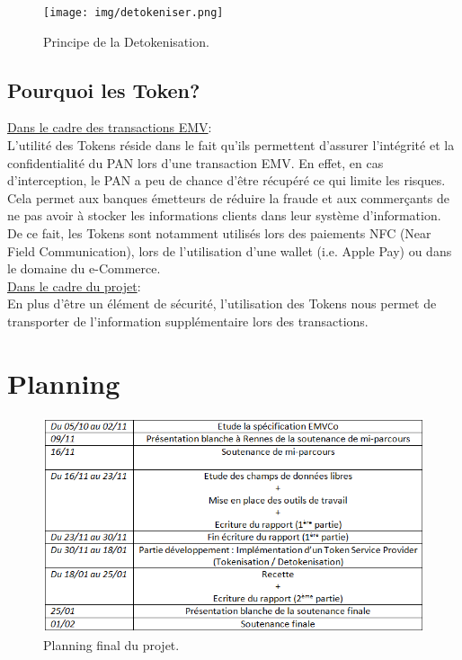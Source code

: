 \documentclass{report}
\begin{document}
\begin{figure}[!h]
    \centering
			\texttt{[image: img/detokeniser.png]}
			\caption{\label{Detokenisation} Principe de la Detokenisation.}			
\end{figure}

\subsection{Pourquoi les Token?}
\noindent
\underline{Dans le cadre des transactions EMV}:\\

\noindent
L'utilité des Tokens réside dans le fait qu'ils permettent d'assurer l'intégrité et la confidentialité du PAN lors d'une transaction EMV. En effet, en cas d'interception, le PAN a peu de chance d'être récupéré ce qui limite les risques. Cela permet aux banques émetteurs de réduire la fraude et aux commerçants de ne pas avoir à stocker les informations clients dans leur système d'information.\\

\noindent
De ce fait, les Tokens sont notamment utilisés lors des paiements NFC (Near Field Communication), lors de l'utilisation d'une wallet (i.e. Apple Pay) ou dans le domaine du e-Commerce.\\

\noindent
\underline{Dans le cadre du projet}:\\

\noindent
En plus d'être un élément de sécurité, l'utilisation des Tokens nous permet de transporter de l'information supplémentaire lors des transactions.


\newpage
\section{Planning}
\begin{figure}[!ht]
    \centering
			\includegraphics[scale=0.9]{img/planningFinal.png}
			\caption{\label{Planning} Planning final du projet.}			
\end{figure}
\end{document}
